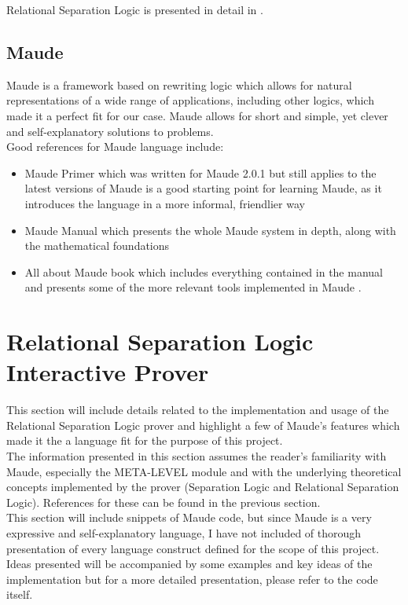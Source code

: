 \documentclass[12pt,a4paper]{article}
\begin{document}
Relational Separation Logic is presented in detail in \cite{relational}.
\subsection{Maude}
Maude \cite{maudesite} is a framework based on rewriting logic \cite{rewritingLogic} which allows for natural representations of a wide range of applications, including other logics, which made it a perfect fit for our case. Maude allows for short and simple, yet clever and self-explanatory solutions to problems. 
\\

 Good references for Maude language include:
 \begin{itemize}
 	\item Maude Primer \cite{primer} which was written for Maude 2.0.1 but still applies to the latest versions of Maude is a good starting point for learning Maude, as it introduces the language in a more informal, friendlier way
 	\item Maude Manual \cite{manual} which presents the whole Maude system in depth, along with the mathematical foundations
 	\item All about Maude book \cite{allAboutMaude} which includes everything contained in the manual and presents some of the more relevant tools implemented in Maude .
 \end{itemize}
\section{Relational Separation Logic Interactive Prover} 
This section will include details related to the implementation and usage of the Relational Separation Logic prover and highlight a few of Maude's features which made it the a language fit for the purpose of this project.
\\

The information presented in this section assumes the reader's familiarity with Maude, especially the META-LEVEL module and with the underlying theoretical concepts implemented by the prover (Separation Logic and Relational Separation Logic). References for these can be found in the previous section.
\\

This section will include snippets of Maude code, but since Maude is a very expressive and self-explanatory language, I have not included of thorough presentation of every language construct defined for the scope of this project. Ideas presented will be accompanied by some examples and key ideas of the implementation but for a more detailed presentation, please refer to the code itself.
 
\end{document}
